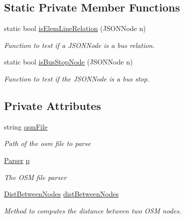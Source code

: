 \subsection*{Static Private Member Functions}
\begin{DoxyCompactItemize}
\item 
static bool \hyperlink{classBusLineParser_aa0d611c093d45f3192dc2bc8437eb4a3}{is\+Elem\+Line\+Relation} (J\+S\+O\+N\+Node n)
\begin{DoxyCompactList}\small\item\em Function to test if a J\+S\+O\+N\+Node is a bus relation. \end{DoxyCompactList}\item 
static bool \hyperlink{classBusLineParser_ad4930b9dd3d5f12ffa5e62520bc39de0}{is\+Bus\+Stop\+Node} (J\+S\+O\+N\+Node n)
\begin{DoxyCompactList}\small\item\em Function to test if the J\+S\+O\+N\+Node is a bus stop. \end{DoxyCompactList}\end{DoxyCompactItemize}
\subsection*{Private Attributes}
\begin{DoxyCompactItemize}
\item 
string \hyperlink{classBusLineParser_a279ee65eb32a498b79e713bdf84a25d6}{osm\+File}
\begin{DoxyCompactList}\small\item\em Path of the osm file to parse\end{DoxyCompactList}\item 
\hyperlink{classParser}{Parser} \hyperlink{classBusLineParser_ae13dc355c5ddc5e97f3f597b40f22e61}{p}
\begin{DoxyCompactList}\small\item\em The O\+SM file parser\end{DoxyCompactList}\item 
\hyperlink{classDistBetweenNodes}{Dist\+Between\+Nodes} \hyperlink{classBusLineParser_a87fba661388bb7e4115b4f73dcb96f6d}{dist\+Between\+Nodes}
\begin{DoxyCompactList}\small\item\em Method to computes the distance between two O\+SM nodes.\end{DoxyCompactList}\end{DoxyCompactItemize}


